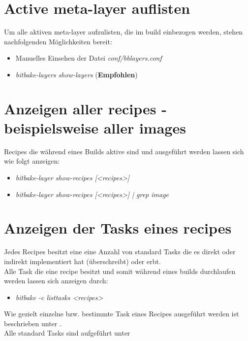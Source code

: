 \section{Active meta-layer auflisten}%
\label{sec:active_meta_layer_auflisten}
Um alle aktiven meta-layer aufzulisten, die im build einbezogen werden, stehen
nachfolgenden Möglichkeiten bereit:

\begin{itemize}
    \item Manuelles Einsehen der Datei \textit{conf/bblayers.conf}
    \item \textit{bitbake-layers show-layers} (\textbf{Empfohlen})
\end{itemize}


\section{Anzeigen aller recipes - beispielsweise aller images}%
\label{sec:anzeigen_aller_recipes}
Recipes die während eines Builds aktive sind und ausgeführt werden lassen sich
wie folgt anzeigen:

\begin{itemize}
    \item \textit{bitbake-layer show-recipes [<recipes>]}
    \item \textit{bitbake-layer show-recipes [<recipes>] | grep image}
\end{itemize}


\section{Anzeigen der Tasks eines recipes}%
\label{sec:anzeigen_der_tasks_eines_recipes}
Jedes Recipes besitzt eine eine Anzahl von standard Tasks die es direkt oder
indirekt implementiert hat (überschreibt) oder erbt.
\\
Alle Task die eine recipe besitzt und somit während eines builds
durchlaufen werden lassen sich anzeigen durch:

\begin{itemize}
    \item \textit{bitbake -c listtasks <recipes>}
\end{itemize}

Wie gezielt einzelne bzw. bestimmte Task eines Recipes ausgeführt werden ist
beschrieben unter .
\\
Alle standard Tasks sind aufgeführt unter\cite[Seite 171-172]
{Gonzalez2018:Embedded_Linux_Development_Using_Yocto_Project_Cookbook_2nd}

